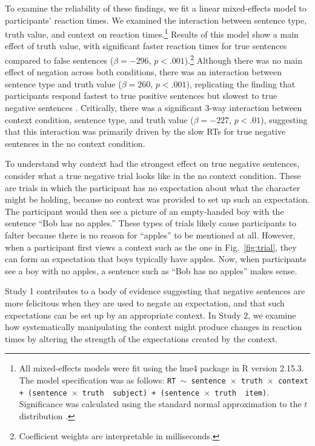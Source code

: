 \documentclass[10pt,letterpaper]{article}
\begin{document}
To examine the reliability of these findings, we fit a linear mixed-effects model to participants' reaction times.  We examined the interaction between sentence type, truth value, and context on reaction times.\footnote{All mixed-effects models were fit using the lme4 package in R version 2.15.3.  The model specification was as follows: \texttt{RT $\sim$ sentence~$\times$~truth~$\times$~context + (sentence~$\times$~truth~\textbar~subject) +  (sentence~$\times$~truth~\textbar~item)}.  Significance was calculated using the standard normal approximation to the $t$ distribution \cite{barr2013}.}  Results of this model show a main effect of truth value, with significant faster reaction times for true sentences compared to false sentences ($\beta= -296$, $p< .001$).\footnote{Coefficient weights are interpretable in milliseconds.}  Although there was no main effect of negation across both conditions, there was an interaction between sentence type and truth value ($\beta= 260$, $p< .001$), replicating the finding that participants respond fastest to true positive sentences but slowest to true negative sentences \cite{hclark1972}.  Critically, there was a significant 3-way interaction between context condition, sentence type, and truth value ($\beta= -227$, $p< .01$), suggesting that this interaction was primarily driven by the slow RTs for true negative sentences in the no context condition.  

To understand why context had the strongest effect on true negative sentences, consider what a true negative trial looks like in the no context condition.  These are trials in which the participant has no expectation about what the character might be holding, because no context was provided to set up such an expectation.  The participant would then see a picture of an empty-handed boy with the sentence ``Bob has no apples.''  These types of trials likely cause participants to falter because there is no reason for ``apples'' to be mentioned at all.  However, when a participant first views a context such as the one in Fig.\ \ref{fig:trial}, they can form an expectation that boys typically have apples.  Now, when participants see a boy with no apples, a sentence such as ``Bob has no apples'' makes sense.

Study 1 contributes to a body of evidence suggesting that negative sentences are more felicitous when they are used to negate an expectation, and that such expectations can be set up by an appropriate context.  In Study 2, we examine how systematically manipulating the context might produce changes in reaction times by altering the strength of the expectations created by the context.  
\end{document}
